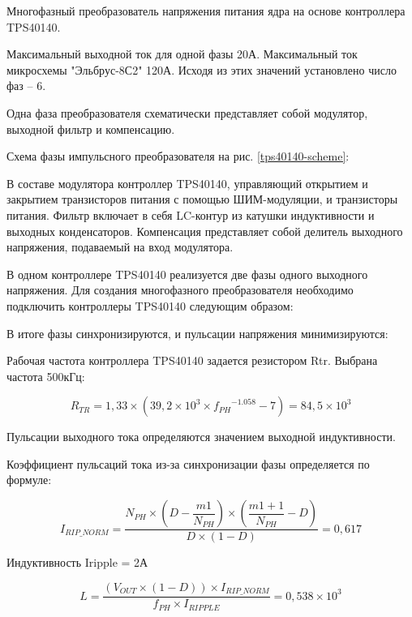 Многофазный преобразователь напряжения питания ядра на основе контроллера TPS40140. \cite{tps40140-c}

Максимальный выходной ток для одной фазы 20А. Максимальный ток микросхемы "Эльбрус-8С2" 120А. Исходя из этих значений установлено число фаз -- 6.

Одна фаза преобразователя схематически представляет собой модулятор, выходной фильтр и компенсацию.

Схема фазы импульсного преобразователя на рис. \ref{tps40140-scheme}:

В составе модулятора контроллер TPS40140, управляющий открытием и закрытием транзисторов питания с помощью ШИМ-модуляции, и транзисторы питания. Фильтр включает в себя LC-контур из катушки индуктивности и выходных конденсаторов. Компенсация представляет собой делитель выходного напряжения, подаваемый на вход модулятора.

В одном контроллере TPS40140 реализуется две фазы одного выходного напряжения. Для создания многофазного преобразователя необходимо подключить контроллеры TPS40140 следующим образом:


В итоге фазы синхронизируются, и пульсации напряжения минимизируются:

Рабочая частота контроллера TPS40140 задается резистором Rtr. Выбрана частота 500кГц:

\begin{equation}
R_{TR} = 1,33 \times (39,2 \times 10^3 \times {f_{PH}}^{-1.058} - 7) = 84,5 \times 10^3
\end{equation}

Пульсации выходного тока определяются значением выходной индуктивности.  

Коэффициент пульсаций тока из-за синхронизации фазы определяется по формуле:

\begin{equation}
I_{RIP\_NORM} = \frac{N_{PH} \times \left(D - \dfrac{m1}{N_{PH}} \right)  \times \left(\dfrac{m1+1}{N_{PH}} - D \right)}{D \times (1-D)} = 0,617
\end{equation}

Индуктивность 
Iripple = 2А

\begin{equation}
L = \frac{(V_{OUT} \times (1-D)) \times I_{RIP\_NORM}}{f_{PH} \times I_{RIPPLE}} = 0,538 \times 10^3
\end{equation}

